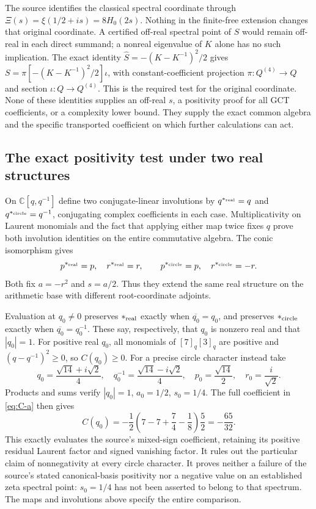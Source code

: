 The source identifies the classical spectral coordinate through
$\Xi(s)=\xi(1/2+is)=8H_0(2s)$.
Nothing in the finite-free extension changes that original coordinate.
A certified off-real spectral point of $S$ would remain off-real in
each direct summand; a nonreal eigenvalue of $K$ alone has no such
implication. The exact identity $\widehat S=-(K-K^{-1})^2/2$ gives
$S=\pi[-(K-K^{-1})^2/2]\iota$, with constant-coefficient projection
$\pi:Q^{(4)}\to Q$ and section $\iota:Q\to Q^{(4)}$.
This is the required test for the original coordinate.
None of these identities supplies
an off-real $s$, a positivity proof for all GCT coefficients, or a
complexity lower bound. They supply the exact common algebra and the
specific transported coefficient on which further calculations can act.

\subsection{The exact positivity test under two real structures}
On $\mathbb C[q,q^{-1}]$ define two conjugate-linear involutions by
$q^{*_{\rm real}}=q$ and $q^{*_{\rm circle}}=q^{-1}$, conjugating
complex coefficients in each case. Multiplicativity on Laurent
monomials and the fact that applying either map twice fixes $q$
prove both involution identities on the entire commutative algebra.
The conic isomorphism gives
\[
 p^{*_{\rm real}}=p,\quad r^{*_{\rm real}}=r,\qquad
 p^{*_{\rm circle}}=p,\quad r^{*_{\rm circle}}=-r.
\]
Both fix $a=-r^2$ and $s=a/2$. Thus they extend the same real structure
on the arithmetic base with different root-coordinate adjoints.

Evaluation at $q_0\ne0$ preserves $*_{\rm real}$ exactly when
$\overline{q_0}=q_0$, and preserves $*_{\rm circle}$ exactly when
$\overline{q_0}=q_0^{-1}$. These say, respectively, that $q_0$ is
nonzero real and that $|q_0|=1$.
For positive real $q_0$, all monomials of $[7]_q[3]_q$ are positive
and $(q-q^{-1})^2\ge0$, so $C(q_0)\ge0$.
For a precise circle character instead take
\[
 q_0=\frac{\sqrt{14}+i\sqrt2}{4},\quad
 q_0^{-1}=\frac{\sqrt{14}-i\sqrt2}{4},\quad
 p_0=\frac{\sqrt{14}}2,\quad r_0=\frac{i}{\sqrt2}.
\]
Products and sums verify $|q_0|=1$, $a_0=1/2$, $s_0=1/4$.
The full coefficient in \eqref{eq:C-a} then gives
\[
 C(q_0)=-\frac12
 \left(7-7+\frac74-\frac18\right)\frac52=-\frac{65}{32}.
\]
This exactly evaluates the source's mixed-sign coefficient, retaining
its positive residual Laurent factor and signed vanishing factor.
It rules out the particular claim of nonnegativity at every circle
character. It proves neither a failure of the source's stated
canonical-basis positivity nor a negative value on an established
zeta spectral point: $s_0=1/4$ has not been asserted to belong to that
spectrum. The maps and involutions above specify the entire comparison.

